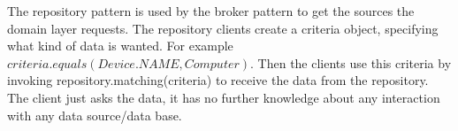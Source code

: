 The repository pattern is used by the broker pattern to get the sources the domain layer requests. The repository clients create a criteria object, specifying what kind of data is wanted. For example $criteria.equals(Device.NAME, Computer)$. Then the clients use this criteria by invoking repository.matching(criteria) to receive the data from the repository. The client just asks the data, it has no further knowledge about any interaction with any data source/data base.







